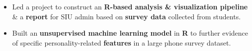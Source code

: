 \documentclass[8pt,a4paper,ragged2e,withhyper]{altacv}
\begin{document}
\begin{paracol}{2}
\divider


\begin{itemize}
    \item Led a project to construct an \textbf{R-based analysis \& visualization pipeline} \& a \textbf{report} for SIU admin based on \textbf{survey data} collected from students.
    
\end{itemize}

\divider

\begin{itemize}
    \item Built an \textbf{unsupervised machine learning model} in \textbf{R} to further evidence of specific personality-related \textbf{features} in a large phone survey dataset.
\end{itemize}

\divider







\end{paracol}
\end{document}
